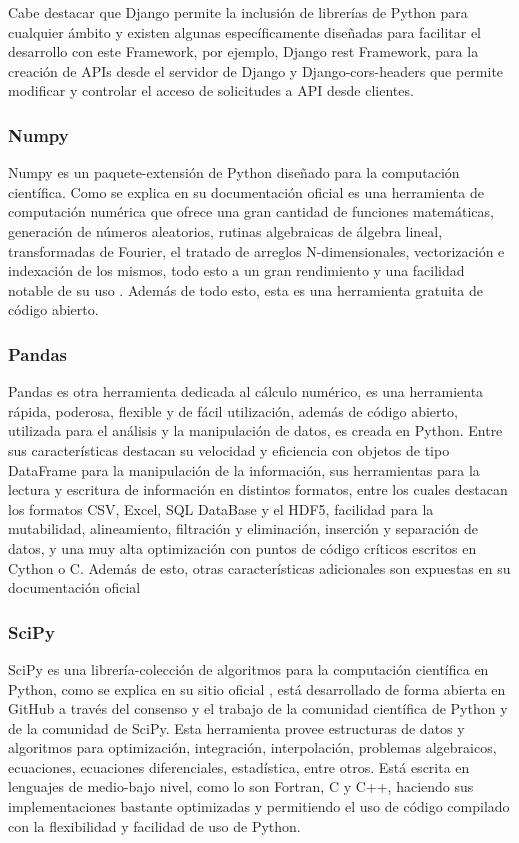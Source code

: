 Cabe destacar que Django permite la inclusión de librerías de Python para
cualquier ámbito y existen algunas específicamente diseñadas para facilitar el
desarrollo con este Framework, por ejemplo, Django rest Framework, para la
creación de APIs desde el servidor de Django  y Django-cors-headers que permite
modificar y controlar el acceso de solicitudes a API desde clientes.

\subsubsection{Numpy}

Numpy es un paquete-extensión de Python diseñado para la computación
científica. Como se explica en su documentación oficial \textcite{Numpy} es una
herramienta de computación numérica que ofrece una gran cantidad de  funciones
matemáticas, generación de números aleatorios, rutinas algebraicas de álgebra
lineal, transformadas de Fourier, el tratado de arreglos N-dimensionales,
vectorización e indexación de los mismos, todo esto a un gran rendimiento y una
facilidad notable de su uso . Además de todo esto, esta es una herramienta
gratuita de código abierto.

\subsubsection{Pandas}

Pandas es otra herramienta dedicada al cálculo numérico, es una herramienta
rápida, poderosa, flexible y de fácil utilización, además de código abierto,
utilizada para el análisis y la manipulación de datos, es creada en Python.
Entre sus características destacan su velocidad y eficiencia con objetos de
tipo DataFrame para la manipulación de la información, sus herramientas para la
lectura y escritura de información en distintos formatos, entre los cuales
destacan los formatos CSV, Excel, SQL DataBase y el HDF5, facilidad para la
mutabilidad, alineamiento, filtración y eliminación, inserción y separación de
datos, y una muy alta optimización con puntos de código críticos escritos en
Cython o C. Además de esto, otras características adicionales son expuestas en
su documentación oficial \textcite{PandasDocs}

\subsubsection{SciPy}
SciPy es una librería-colección de algoritmos para la computación científica en
Python, como se explica en su sitio oficial \textcite{Scipy}, está desarrollado de
forma abierta en GitHub a través del consenso y el trabajo de la comunidad
científica de Python y de la comunidad de SciPy. Esta herramienta provee estructuras
de datos y
algoritmos para optimización, integración, interpolación, problemas algebraicos,
ecuaciones, ecuaciones diferenciales, estadística, entre otros. Está escrita
en lenguajes de medio-bajo nivel, como lo son Fortran, C y C++, haciendo sus
implementaciones bastante optimizadas y permitiendo el uso de código compilado
con la flexibilidad y facilidad de uso de Python.

